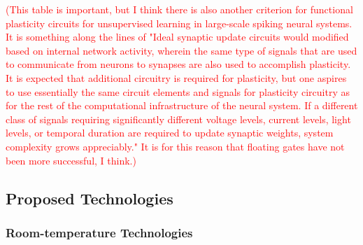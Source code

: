 \documentclass[twocolumn]{article}
\begin{document}
\textcolor{red}{(This table is important, but I think there is also another criterion for functional plasticity circuits for unsupervised learning in large-scale spiking neural systems. It is something along the lines of "Ideal synaptic update circuits would modified based on internal network activity, wherein the same type of signals that are used to communicate from neurons to synapses are also used to accomplish plasticity. It is expected that additional circuitry is required for plasticity, but one aspires to use essentially the same circuit elements and signals for plasticity circuitry as for the rest of the computational infrastructure of the neural system. If a different class of signals requiring significantly different voltage levels, current levels, light levels, or temporal duration are required to update synaptic weights, system complexity grows appreciably." It is for this reason that floating gates have not been more successful, I think.)}

\subsection{Proposed Technologies}
\subsubsection{Room-temperature Technologies}
\end{document}
